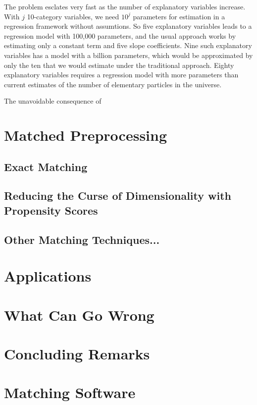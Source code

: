 \documentclass[11pt,titlepage]{article}
\begin{document}
The problem esclates very fast as the number of explanatory variables
increase.  With $j$ 10-category variables, we need $10^j$ parameters
for estimation in a regression framework without assumtions.  So five
explanatory variables leads to a regression model with 100,000
parameters, and the usual approach works by estimating only a constant
term and five slope coefficients.  Nine such explanatory variables has
a model with a billion parameters, which would be approximated by only
the ten that we would estimate under the traditional approach.  Eighty
explanatory variables requires a regression model with more parameters
than current estimates of the number of elementary particles in the
universe.

The unavoidable consequence of 

\section{Matched Preprocessing}

\subsection{Exact Matching}

\subsection{Reducing the Curse of Dimensionality with Propensity Scores}

\subsection{Other Matching Techniques...}

\section{Applications}

\section{What Can Go Wrong}

\section{Concluding Remarks}

\appendix
\section{Matching Software}




\end{document}
